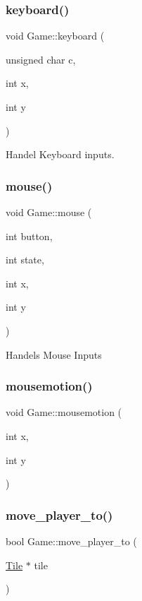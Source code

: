 \subsubsection{\texorpdfstring{keyboard()}{keyboard()}}
{\footnotesize\ttfamily void Game\+::keyboard (\begin{DoxyParamCaption}\item[{unsigned char}]{c,  }\item[{int}]{x,  }\item[{int}]{y }\end{DoxyParamCaption})}

Handel Keyboard inputs. \mbox{\label{classGame_a0d2c45b51376f114fe8962d272f26c1f}} 
\subsubsection{\texorpdfstring{mouse()}{mouse()}}
{\footnotesize\ttfamily void Game\+::mouse (\begin{DoxyParamCaption}\item[{int}]{button,  }\item[{int}]{state,  }\item[{int}]{x,  }\item[{int}]{y }\end{DoxyParamCaption})}

Handels Mouse Inputs \mbox{\label{classGame_af56f813ded5dbb01083c3e673fa2090b}} 
\subsubsection{\texorpdfstring{mousemotion()}{mousemotion()}}
{\footnotesize\ttfamily void Game\+::mousemotion (\begin{DoxyParamCaption}\item[{int}]{x,  }\item[{int}]{y }\end{DoxyParamCaption})}

\mbox{\label{classGame_aae6b9f31b51dfd44e23d3d9aa18f7fe8}} 
\subsubsection{\texorpdfstring{move\+\_\+player\+\_\+to()}{move\_player\_to()}}
{\footnotesize\ttfamily bool Game\+::move\+\_\+player\+\_\+to (\begin{DoxyParamCaption}\item[{\hyperlink{classTile}{Tile} $\ast$}]{tile }\end{DoxyParamCaption})\hspace{0.3cm}{\ttfamily [private]}}

